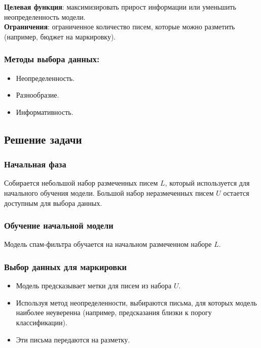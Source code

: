 \documentclass{article}
\begin{document}
\noindent \textbf{Целевая функция}: максимизировать прирост информации или уменьшить неопределенность модели.\\

\noindent \textbf{Ограничения}: ограниченное количество писем, которые можно разметить (например, бюджет на маркировку).

\subsubsection*{Методы выбора данных:}
\begin{itemize}
    \item Неопределенность.
    \item Разнообразие.
    \item Информативность.
\end{itemize}

\subsection*{Решение задачи}

\subsubsection*{Начальная фаза}

Собирается небольшой набор размеченных писем \(L\), который используется для начального обучения модели. Большой набор неразмеченных писем \(U\) остается доступным для выбора данных.

\subsubsection*{Обучение начальной модели}

Модель спам-фильтра обучается на начальном размеченном наборе \(L\).

\subsubsection*{Выбор данных для маркировки}
\begin{itemize}
    \item Модель предсказывает метки для писем из набора \(U\).
    \item Используя метод неопределенности, выбираются письма, для которых модель наиболее неуверенна (например, предсказания близки к порогу классификации).
    \item Эти письма передаются на разметку.
\end{itemize}
\end{document}
